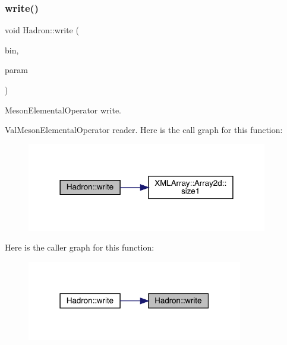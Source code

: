 \subsubsection{\texorpdfstring{write()}{write()}\hspace{0.1cm}{\footnotesize\ttfamily [63/95]}}
{\footnotesize\ttfamily void Hadron\+::write (\begin{DoxyParamCaption}\item[{\mbox{\hyperlink{classADATIO_1_1BinaryWriter}{Binary\+Writer}} \&}]{bin,  }\item[{const \mbox{\hyperlink{structHadron_1_1ValMesonElementalOperator__t}{Val\+Meson\+Elemental\+Operator\+\_\+t}} \&}]{param }\end{DoxyParamCaption})}



Meson\+Elemental\+Operator write. 

Val\+Meson\+Elemental\+Operator reader. Here is the call graph for this function\+:
\nopagebreak
\begin{figure}[H]
\begin{center}
\leavevmode
\includegraphics[width=298pt]{d1/daf/namespaceHadron_af16b79349f97386286cfc1cd9dfb73f0_cgraph}
\end{center}
\end{figure}
Here is the caller graph for this function\+:
\nopagebreak
\begin{figure}[H]
\begin{center}
\leavevmode
\includegraphics[width=267pt]{d1/daf/namespaceHadron_af16b79349f97386286cfc1cd9dfb73f0_icgraph}
\end{center}
\end{figure}
\mbox{\label{namespaceHadron_a8953a24e53ffe4d60e9c0ba26a48a9e3}} 
